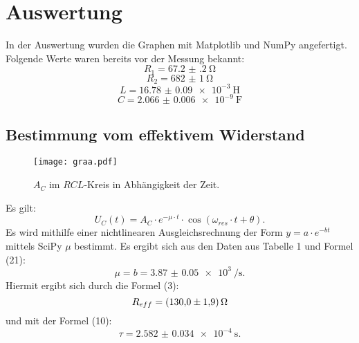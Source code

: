 \section{Auswertung}
\label{sec:Auswertung}
In der Auswertung wurden die Graphen mit Matplotlib \cite{matplotlib} und NumPy \cite{numpy} angefertigt.\\


Folgende Werte waren bereits vor der Messung bekannt:
\begin{displaymath}
R_1 = \SI{67.2(2)}{\ohm}
\end{displaymath}
\begin{displaymath}
R_2 = \SI{682(1)}{\ohm}
\end{displaymath}
\begin{displaymath}
L = \SI{16.78(9)e-3}{\henry}
\end{displaymath}
\begin{displaymath}
C = \SI{2.066(6)e-9}{\farad}
\end{displaymath}


\subsection{Bestimmung vom effektivem Widerstand}
\begin{figure}[H]
	\centering
	\caption{$A_C$ im $RCL$-Kreis in Abhängigkeit der Zeit.}
	\texttt{[image: graa.pdf]}
	\label{fig:graa}
\end{figure}

Es gilt:
\begin{equation}
	U_C(t) = A_C \cdot e^{-\mu \cdot t} \cdot \cos(\omega_{res} \cdot t + \theta)\text{.}
\end{equation}
Es wird mithilfe einer nichtlinearen Ausgleichsrechnung der Form $y=a\cdot e^{-b t}$ mittels SciPy \cite{scipy} $\mu$ bestimmt. Es ergibt sich aus den Daten aus Tabelle 1 und Formel (21):
\begin{displaymath}
\mu = b = \SI{3.87(5)e3}{\per\second}\text{.}
\end{displaymath}
Hiermit ergibt sich durch die Formel (3):
\begin{displaymath}
R_{eff} = \SI{130 \pm 1.9}{\ohm}
\end{displaymath}
und mit der Formel (10):
\begin{displaymath}
\tau = \SI{2.582(34)e-4}{\second}\text{.}
\end{displaymath}


